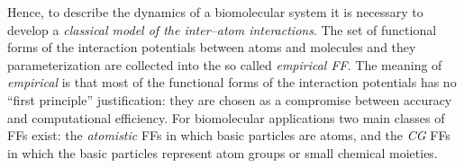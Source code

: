 
Hence, to describe the dynamics of a biomolecular system it is necessary to develop a \textit{classical model of 
the inter--atom interactions}. The set of functional forms of the interaction potentials between atoms and 
molecules and they parameterization are collected into the so called \textit{empirical \acf{FF}}. The meaning of 
\textit{empirical} is that most of the functional forms of the interaction potentials has no ``first principle'' 
justification: they are chosen as a compromise between accuracy and computational efficiency. For biomolecular 
applications two main classes of \acp{FF} exist: the \textit{atomistic} \acp{FF} in which basic
particles are atoms, and the \textit{\ac{CG}} \acp{FF} in which the basic particles represent atom groups or
small chemical moieties.


